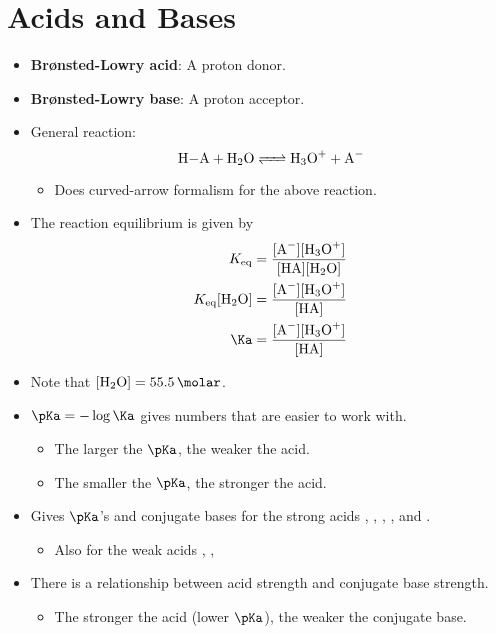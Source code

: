 \documentclass[../notes.tex]{subfiles}
\begin{document}
\section{Acids and Bases}
\begin{itemize}
    \item {}\textbf{Br\o nsted-Lowry acid}: A proton donor.
    \item \textbf{Br\o nsted-Lowry base}: A proton acceptor.
    \item General reaction:
    \begin{equation*}
        \ce{H-A + H2O <=> H3O+ + A-}
    \end{equation*}
    \begin{itemize}
        \item Does curved-arrow formalism for the above reaction.
    \end{itemize}
    \item The reaction equilibrium is given by
    \begin{align*}
        K_\text{eq} &= \frac{[\ce{A-}][\ce{H3O+}]}{[\ce{HA}][\ce{H2O}]}\\
        K_\text{eq}[\ce{H2O}] &= \frac{[\ce{A-}][\ce{H3O+}]}{[\ce{HA}]}\\
       \Ka &= \frac{[\ce{A-}][\ce{H3O+}]}{[\ce{HA}]}
    \end{align*}
    \item Note that $[\ce{H2O}]=\SI{55.5}{\molar}$.
    \item $\pKa=-\log\Ka$ gives numbers that are easier to work with.
    \begin{itemize}
        \item The larger the $\pKa$, the weaker the acid.
        \item The smaller the $\pKa$, the stronger the acid.
    \end{itemize}
    \item Gives $\pKa$'s and conjugate bases for the strong acids , , , , and .
    \begin{itemize}
        \item Also for the weak acids , , 
    \end{itemize}
    \item There is a relationship between acid strength and conjugate base strength.
    \begin{itemize}
        \item The stronger the acid (lower $\pKa$), the weaker the conjugate base.

\end{itemize}
\end{itemize}
\end{document}
